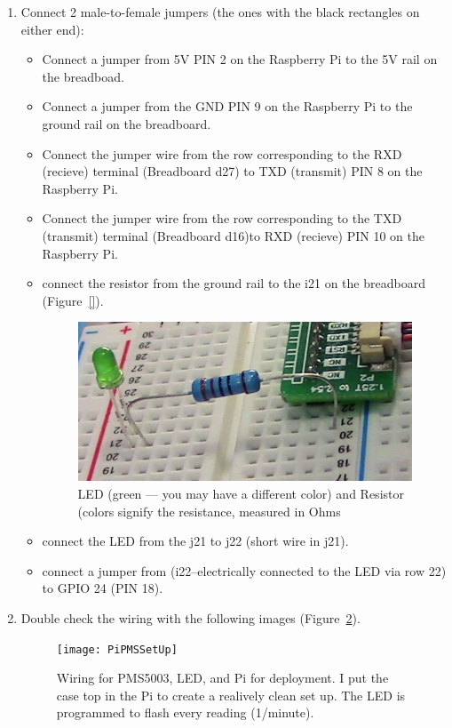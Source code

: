 \documentclass{article}
\begin{document}
\begin{enumerate}
  \item Connect 2 male-to-female jumpers (the ones with the black rectangles on either end):
 
\begin{itemize}
  \item Connect a jumper from 5V PIN 2 on the Raspberry Pi to the 5V rail on the breadboad.

  \item Connect a jumper from the GND PIN 9 on the Raspberry Pi to the ground rail on the breadboard. 

  \item Connect the jumper wire from the row corresponding to the RXD (recieve) terminal (Breadboard d27) to TXD (transmit) PIN 8 on the Raspberry Pi. 
  \item Connect the jumper wire from the row corresponding to the TXD (transmit) terminal (Breadboard d16)to RXD (recieve) PIN 10 on the Raspberry Pi.
  \item connect the resistor from the ground rail to the i21 on the breadboard (Figure~\ref{}).
  
\begin{figure}
\includegraphics[width=1.00\textwidth]{images/2_Resistor_LED_Breadboard.JPG}
\caption{LED (green --- you may have a different color) and Resistor (colors signify the resistance, measured in Ohms}
\label{fig:Breadborad-VCC-GND}
\end{figure}


  \item connect the LED from the j21 to j22 (short wire in j21).
  \item connect a jumper from (i22--electrically connected to the LED via row 22) to GPIO 24 (PIN 18).
\end{itemize}

\item Double check the wiring with the following images (Figure~\ref{fig:wiring}).

\begin{figure}
\texttt{[image: PiPMSSetUp]}
\caption{Wiring for PMS5003, LED, and Pi for deployment. I put the case top in the Pi to create a realively clean set up. The LED is programmed to flash every reading (1/minute).}
\label{fig:wiring}
\end{figure}

\end{enumerate}
\end{document}

